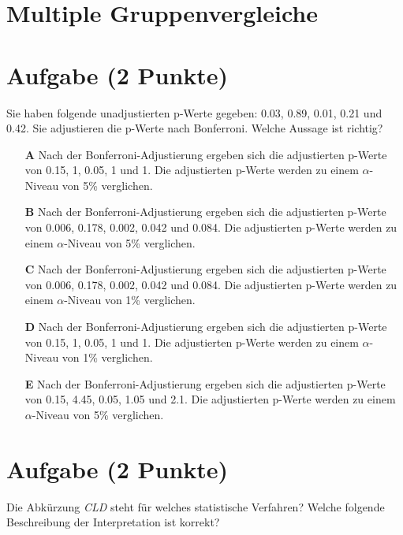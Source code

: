 \documentclass[a4paper, 9pt]{scrartcl}\usepackage[]{graphicx}\usepackage[]{xcolor}
\begin{document}
\section*{Multiple Gruppenvergleiche}    

\section{Aufgabe \hfill (2 Punkte)}



Sie haben folgende unadjustierten p-Werte gegeben: 0.03, 0.89, 0.01, 0.21 und 0.42. Sie adjustieren die p-Werte nach
Bonferroni. Welche Aussage ist richtig?



\begin{enumerate}
\item [\textbf{A} \msquare] Nach der Bonferroni-Adjustierung ergeben sich die adjustierten p-Werte von 0.15, 1, 0.05, 1 und 1. Die adjustierten p-Werte werden zu einem $\alpha$-Niveau von 5\% verglichen.
\item [\textbf{B} \msquare] Nach der Bonferroni-Adjustierung ergeben sich die adjustierten p-Werte von 0.006, 0.178, 0.002, 0.042 und 0.084. Die adjustierten p-Werte werden zu einem $\alpha$-Niveau von 5\% verglichen.
\item [\textbf{C} \msquare] Nach der Bonferroni-Adjustierung ergeben sich die adjustierten p-Werte von 0.006, 0.178, 0.002, 0.042 und 0.084. Die adjustierten p-Werte werden zu einem $\alpha$-Niveau von 1\% verglichen.
\item [\textbf{D} \msquare] Nach der Bonferroni-Adjustierung ergeben sich die adjustierten p-Werte von 0.15, 1, 0.05, 1 und 1. Die adjustierten p-Werte werden zu einem $\alpha$-Niveau von 1\% verglichen.
\item [\textbf{E} \msquare] Nach der Bonferroni-Adjustierung ergeben sich die adjustierten p-Werte von 0.15, 4.45, 0.05, 1.05 und 2.1. Die adjustierten p-Werte werden zu einem $\alpha$-Niveau von 5\% verglichen.
\end{enumerate}

\section{Aufgabe \hfill (2 Punkte)}



Die Abkürzung \textit{CLD} steht für welches statistische Verfahren? Welche folgende Beschreibung der Interpretation ist korrekt?
\end{document}
